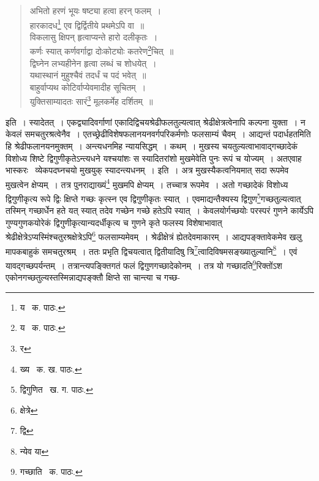 \documentclass[11pt, openany]{book}
\begin{document}
{\begin{quote}
{\qt अभितो हरणं भूयः षष्ट्या हत्वा हरन् फलम्~।\\
हारकादध\renewcommand{\thefootnote}{१}\footnote{य \textendash\ क. पाठः.} एव द्विर्द्वितीये प्रथमेऽपि वा~॥\\
विकलासु क्षिपन् हृत्वाप्यन्ते हारो दलीकृतः~।\\
कर्णः स्यात् कर्णवर्गाद्वा दोःकोट्योः कतरेण\renewcommand{\thefootnote}{२}\footnote{य \textendash\ क. पाठः.}चित्~॥\\
द्विघ्नेन लभ्यहीनेन हृत्वा लब्धं च शोधयेत्~।\\
यथास्थानं मुहुश्चैवं तदर्धं च पदं भवेत्~॥\\
बाहुर्वाप्यथ कोटिर्वाप्येवमादीह सूचितम्~।\\
युक्तिसाम्यादतः सारं\renewcommand{\thefootnote}{३}\footnote{र} मूलकर्मेह दर्शितम्~॥}
\end{quote}

\noindent इति~। स्यादेतत्~। एकद्व्यादिवर्गाणां एकादिद्विचयश्रेढीफलतुल्यत्वात् श्रेढीक्षेत्रत्वेनापि कल्पना युक्ता~। न केवलं समचतुरश्रत्वेनैव~। एतच्छ्रेढीविशेषफलानयनवर्गपरिकर्मणोः फलसाम्यं चैवम्~। {\qt आद्यन्तं पदार्धहतमि}ति हि श्रेढीफलानयनमुक्तम्~। अन्त्यधनमिह न्यायसिद्धम्~। कथम्~। मुखस्य चयतुल्यत्वाभावाद्गच्छादेकं विशोध्य शिष्टे द्विगुणीकृतेऽन्त्यधने यश्चयांशः स स्यादितरांशो मुखमेवेति पुनः रूपं च योज्यम्~। अतएवाह भास्करः \textendash\ {\qt व्येकपदघ्नचयो मुखयुक् स्यादन्त्यधनम्}~। इति~। अत्र मुखस्यैकत्वनियमात् सदा रूपमेव मुखत्वेन क्षेप्यम्~। तत्र पुनराद्याख्यं\renewcommand{\thefootnote}{४}\footnote{ख्य \textendash\ क. ख. पाठः.} मुखमपि क्षेप्यम्~। तच्चात्र रूपमेव~। अतो गच्छादेकं विशोध्य द्विगुणीकृत्य रूपे द्विः क्षिप्ते गच्छः कृत्स्न एव द्विगुणीकृतः स्यात्~। एवमाद्यन्तैक्यस्य द्विगुण\renewcommand{\thefootnote}{५}\footnote{द्विगुणित \textendash\ ख. ग. पाठः.}गच्छतुल्यत्वात् तस्मिन् गच्छार्धेन हते यत् स्यात् तदेव गच्छेन गच्छे हतेऽपि स्यात्~। केवलयोर्गच्छयोः परस्परं गुणने कार्येऽपि गुण्यगुणकयोरेकं द्विगुणीकृत्यान्यदर्धीकृत्य च गुणने कृते फलस्य विशेषाभावात् श्रेढीक्षेत्रेऽप्यस्मिंश्चतुरश्रक्षेत्रेऽपि\renewcommand{\thefootnote}{६}\footnote{क्षेत्रे} फलसाम्यमेवम्~। श्रेढीक्षेत्रं ह्येतदेवमाकारम्~। आद्यपङ्क्तावेकमेव खलु मापकबाहुकं समचतुरश्रम्~। ततः प्रभृति द्विचयत्वात् द्वितीयादिषु त्रि\renewcommand{\thefootnote}{७}\footnote{द्वि}त्वादिविषमसङ्ख्यातुल्यानि\renewcommand{\thefootnote}{८}\footnote{न्येव या}~। एवं यावद्गच्छपर्यन्तम्~। तत्रान्त्यपङ्क्तिगतं फलं द्विगुणगच्छादेकोनम्~। तत्र यो गच्छादति\renewcommand{\thefootnote}{९}\footnote{गच्छाति \textendash\ क. पाठः.}रिक्तोंऽश एकोनगच्छतुल्यस्तस्मिन्नाद्यपङ्क्तौ क्षिप्ते सा चान्त्या च गच्छ-

}
\end{document}
